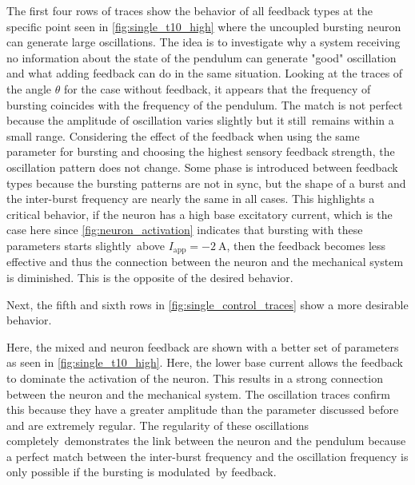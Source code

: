 The first four rows of traces show the behavior of all feedback types at the specific point seen in \cref{fig:single_t10_high} where the uncoupled bursting neuron can generate large oscillations.
The idea is to investigate why a system receiving no information about the state of the pendulum can generate "good" oscillation and what adding feedback can do in the same situation.
Looking at the traces of the angle $\theta$ for the case without feedback, it appears that the frequency of bursting coincides with the frequency of the pendulum.
The match is not perfect because the amplitude of oscillation varies slightly but it still remains within a small range.
Considering the effect of the feedback when using the same parameter for bursting and choosing the highest sensory feedback strength, the oscillation pattern does not change.
Some phase is introduced between feedback types because the bursting patterns are not in sync, but the shape of a burst and the inter-burst frequency are nearly the same in all cases.
This highlights a critical behavior, if the neuron has a high base excitatory current, which is the case here since \cref{fig:neuron_activation} indicates that bursting with these parameters starts slightly above $I_\text{app} = \qty{-2}{\ampere}$, then the feedback becomes less effective and thus the connection between the neuron and the mechanical system is diminished.
This is the opposite of the desired behavior.

Next, the fifth and sixth rows in \cref{fig:single_control_traces} show a more desirable behavior. 

Here, the mixed and neuron feedback are shown with a better set of parameters as seen in \cref{fig:single_t10_high}.
Here, the lower base current allows the feedback to dominate the activation of the neuron.
This results in a strong connection between the neuron and the mechanical system.
The oscillation traces confirm this because they have a greater amplitude than the parameter discussed before and are extremely regular.
The regularity of these oscillations completely demonstrates the link between the neuron and the pendulum because a perfect match between the inter-burst frequency and the oscillation frequency is only possible if the bursting is modulated by feedback.

